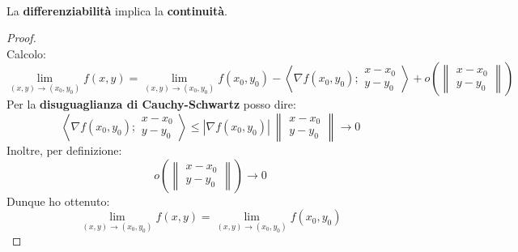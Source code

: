 \documentclass[a4paper, oneside]{article}
\begin{document}
    \hfill\\
    \begin{observation}
        La \textbf{differenziabilità} implica la \textbf{continuità}.
    \end{observation}
    \begin{proof}\hfill\\
        Calcolo:
        \[\lim_{(x,y)\to(x_0,y_0)} f(x,y) = \lim_{(x,y)\to(x_0,y_0)} f(x_0,y_0) - \left\langle \nabla f(x_0,y_0); \begin{matrix}
            x-x_0 \\ y-y_0
        \end{matrix}\right\rangle + o \left(\left\lVert  \begin{matrix} x-x_0 \\ y-y_0 \end{matrix}\right\rVert \right)  \]
        Per la \textbf{disuguaglianza di Cauchy-Schwartz} posso dire:
        \[\left\langle \nabla f(x_0,y_0); \begin{matrix}
            x-x_0 \\ y-y_0
        \end{matrix}\right\rangle \leq \left|\nabla f(x_0,y_0)\right| \ \left\lVert  \begin{matrix} x-x_0 \\ y-y_0 \end{matrix}\right\rVert \to 0\]
        Inoltre, per definizione:
        \[o \left(\left\lVert  \begin{matrix} x-x_0 \\ y-y_0 \end{matrix}\right\rVert\right) \to 0\]
        Dunque ho ottenuto:
        \[\lim_{(x,y)\to(x_0,y_0)} f(x,y) = \lim_{(x,y)\to(x_0,y_0)} f(x_0,y_0)\]
    \end{proof}
\end{document}
